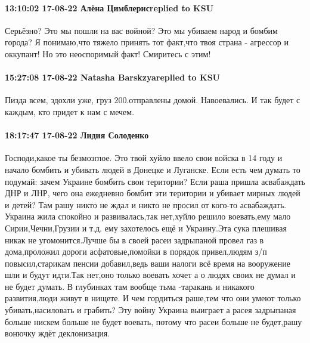  
 
 
 
 

\paragraph{13:10:02 17-08-22 Алёна Цимблерисreplied to KSU}

Серьёзно? Это мы пошли на вас войной? Это мы убиваем народ и бомбим города? Я
понимаю,что тяжело принять тот факт,что твоя страна - агрессор и оккупант! Но
это неоспоримый факт! Смиритесь с этим!

\paragraph{15:27:08 17-08-22 Natasha Barskzyareplied to KSU}

Пизда всем, здохли уже, груз 200.отправлены домой. Навоевались. И так будет с
каждым, кто придет к нам с мечем.

\paragraph{18:17:47 17-08-22 Лидия Солоденко}

\obeycr
Господи,какое ты безмозглое.
Это твой хуйло ввело свои войска в 14 году и начало бомбить и убивать людей в Донецке и Луганске.
Если есть чем думать то подумай: зачем Украине бомбить свои територии?
Если раша пришла асвабаждать ДНР и ЛНР, чего она ежедневно бомбит эти територии и убивает мирных людей и детей? Там рашу никто не ждал и никто не просил от кого-то асвабаждать.
Украина жила спокойно и развивалась,так нет,хуйло решило воевать,ему мало Сирии,Чечни,Грузии и т.д. ему захотелось ещё и Украину.Эта сука плешивая никак не угомонится.Лучше бы в своей расеи задрыпаной провел газ в дома,проложил дороги асфатовые,помойки в порядок привел,людям з/п повысил,старикам пенсии добавил,ведь ваши налоги всё время на вооружение шли и будут идти.Так нет,оно только воевать хочет а о людях своих не думал и не будет думать.
В глубинках там вообще тьма -таракань и никакого развития,люди живут в нищете. И чем гордиться раше,тем что они умеют только убивать,насиловать и грабить?
Эту войну Украина выиграет а расея задрыпаная больше нискем больше не будет воевать, потому что расеи больше не будет,рашу вонючку ждёт деклонизация.
\restorecr

